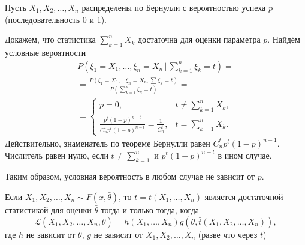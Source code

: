 \begin{ex}
  Пусть $X_1, X_2, \dots, X_n$ распределены по Бернулли с вероятностью успеха $p$
	(последовательность 0 и 1).

	Докажем, что статистика $\sum_{k=1}^n X_k$ достаточна для оценки параметра $p$.
Найдём условные вероятности
  \begin{multline*}
		P\left(\xi_1 = X_1, \dots, \xi_n = X_n\,\Big|\, \sum_{k=1}^n \xi_k =
		t\right) = \\
		= \frac{P(\xi_1 = X_1, \dots \xi_n = X_n, \sum \xi_k = t)}{P\left(\sum_{k=1}^n \xi_k = t\right)} = \\
    = \begin{cases}
			p = 0, &t \neq \sum_{k=1}^n X_k, \\
			\frac{ p^t (1-p)^{n-t} }{ C_n^t p^t (1-p)^{n-t} } = \frac{1}{C_n^t}, &t
			= \sum_{k=1}^n X_k.
    \end{cases}
  \end{multline*}
	Действительно, знаменатель по теореме Бернулли равен $ C^t_n p^t(1-p)^{n-1} $.
	Числитель равен нулю, если $ t \ne \sum_{k=1}^n $ и $ p^t(1-p)^{n-t} $ в ином
	случае.

	Таким образом, условная вероятность в любом случае не зависит от $ p $.
\end{ex}

\begin{theorem}
  Если $X_1, X_2, \dots, X_n \sim F(x, \bar\theta)$, то $\bar t = \bar t (X_1,
	\dots, X_n)$ является достаточной статистикой для оценки $\bar\theta$ тогда и
	только тогда, когда 
  \[
    \mathscr{L}(X_1, X_2, \dots, X_n, \bar\theta) = h(X_1, \dots, X_n)
		g(\bar\theta, \bar t (X_1, X_2, \dots, X_n)),
  \]
  где $h$ не зависит от $\theta$, $g$ не зависит от $X_1, X_2, \dots, X_n$
	(разве что через $\bar t$)
\end{theorem}

